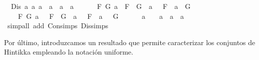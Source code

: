 \begin{isabellebody}
\ \ {\isachardoublequoteopen}Dis\ a{}\ a{}\ a{}\ {\isacharequal}\ {\isacharparenleft}a{}\ {\isacharequal}\ a{}\ \isactrlbold {\isasymor}\ a{}\ {\isasymor}\ \isanewline
\ \ \ \ {\isacharparenleft}{\isasymexists}F\ G{\isachardot}\ a{}\ {\isacharequal}\ F\ \isactrlbold {\isasymrightarrow}\ G\ {\isasymand}\ a{}\ {\isacharequal}\ \isactrlbold {\isasymnot}\ F\ {\isasymand}\ a{}\ {\isacharequal}\ G{\isacharparenright}\ {\isasymor}\ \isanewline
\ \ \ \ {\isacharparenleft}{\isasymexists}F\ G{\isachardot}\ a{}\ {\isacharequal}\ \isactrlbold {\isasymnot}\ {\isacharparenleft}F\ \isactrlbold {\isasymand}\ G{\isacharparenright}\ {\isasymand}\ a{}\ {\isacharequal}\ \isactrlbold {\isasymnot}\ F\ {\isasymand}\ a{}\ {\isacharequal}\ \isactrlbold {\isasymnot}\ G{\isacharparenright}\ {\isasymor}\ \isanewline
\ \ \ \ a{}\ {\isacharequal}\ \isactrlbold {\isasymnot}\ {\isacharparenleft}\isactrlbold {\isasymnot}\ a{}{\isacharparenright}\ {\isasymand}\ a{}\ {\isacharequal}\ a{}{\isacharparenright}{\isachardoublequoteclose}\ \isanewline
%
\isadelimproof
\ \ %
\endisadelimproof
%
\isatagproof
{}\isamarkupfalse%
\ {\isacharparenleft}simp{\isacharunderscore}all\ add{\isacharcolon}\ Con{\isachardot}simps\ Dis{\isachardot}simps{\isacharparenright}%
\endisatagproof
{\isafoldproof}%
%
\isadelimproof
%
\endisadelimproof
%
\begin{isamarkuptext}%
Por último, introduzcamos un resultado que permite caracterizar los conjuntos de Hintikka 
  empleando la notación uniforme.


\end{isamarkuptext}
\end{isabellebody}
